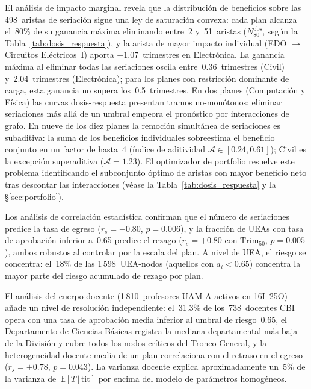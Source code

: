 \documentclass[11pt,letterpaper]{article}
\newcommand{\ETtit}{\mathbb{E}[T\,|\,\mathrm{tit}]}
\begin{document}
El análisis de impacto marginal revela que la distribución de beneficios sobre las
498~aristas de seriación sigue una ley de saturación convexa: cada plan alcanza
el~80\% de su ganancia máxima eliminando entre~2 y~51~aristas ($N_{80}^{\mathrm{obs}}$,
según la Tabla~\ref{tab:dosis_respuesta}), y la arista de mayor impacto individual
(EDO $\to$ Circuitos Eléctricos~I) aporta $-1.07$~trimestres en Electrónica.
La ganancia máxima al eliminar todas las seriaciones oscila entre~0.36~trimestres
(Civil) y~2.04~trimestres (Electrónica); para los planes con restricción
dominante de carga, esta ganancia no supera los~0.5~trimestres.
En dos planes (Computación y Física) las curvas dosis-respuesta presentan tramos
no-monótonos: eliminar seriaciones más allá de un umbral empeora el pronóstico
por interacciones de grafo.
En nueve de los diez planes la remoción simultánea de seriaciones es subaditiva:
la suma de los beneficios individuales sobreestima el beneficio conjunto en un
factor de hasta~4 (índice de aditividad $\mathcal{A} \in [0.24, 0.61]$); Civil es
la excepción superaditiva ($\mathcal{A}=1.23$).
El optimizador de portfolio resuelve este problema identificando el subconjunto
óptimo de aristas con mayor beneficio neto tras descontar las interacciones
(véase la Tabla~\ref{tab:dosis_respuesta} y la \S\ref{sec:portfolio}).

Los análisis de correlación estadística confirman que el número de seriaciones
predice la tasa de egreso ($r_s = -0.80$, $p = 0.006$), y la fracción de UEAs
con tasa de aprobación inferior a~0.65 predice el rezago ($r_s = +0.80$ con
$\mathrm{Trim}_{50}$, $p = 0.005$), ambos robustos al controlar por la escala
del plan.
A nivel de UEA, el riesgo se concentra: el~18\% de las 1\,598~UEA-nodos
(aquellos con $a_i < 0.65$) concentra la mayor parte del riesgo acumulado de
rezago por plan.

El análisis del cuerpo docente (1\,810~profesores UAM-A activos en 16I--25O)
añade un nivel de resolución independiente: el~31.3\% de los~738~docentes
CBI opera con una tasa de aprobación media inferior al umbral de riesgo~0.65,
el Departamento de Ciencias Básicas registra la mediana departamental más baja
de la División y cubre todos los nodos críticos del Tronco General,
y la heterogeneidad docente media de un plan correlaciona con el retraso en
el egreso ($r_s = +0.78$, $p = 0.043$).
La varianza docente explica aproximadamente un~5\% de la varianza de~$\ETtit$
por encima del modelo de parámetros homogéneos.
\end{document}
